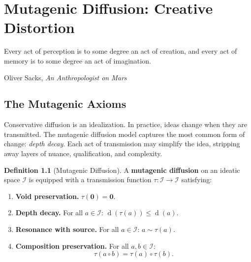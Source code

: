\documentclass[11pt,openany]{book}
\theoremstyle{definition}
\newtheorem{definition}[axiom]{Definition}
\theoremstyle{plain}
\theoremstyle{remark}
\newcommand{\IS}{\mathcal{I}}               %
\newcommand{\compose}{\circ}                 %
\newcommand{\void}{\mathbf{0}}              %
\newcommand{\res}{\sim}                      %
\newcommand{\depth}{\operatorname{d}}       %
\newcommand{\transmit}{\tau}                 %
\begin{document}
\chapter{Mutagenic Diffusion: Creative Distortion}
\label{ch:mutagenic}

\epigraph{Every act of perception is to some degree an act of creation, and every act of memory is to some degree an act of imagination.}{Oliver Sacks, \textit{An Anthropologist on Mars}}

\section{The Mutagenic Axioms}

Conservative diffusion is an idealization. In practice, ideas change when they are transmitted. The mutagenic diffusion model captures the most common form of change: \emph{depth decay}. Each act of transmission may simplify the idea, stripping away layers of nuance, qualification, and complexity.

\begin{definition}[Mutagenic Diffusion]
\label{def:mutagenic}
A \textbf{mutagenic diffusion} on an ideatic space $\IS$ is equipped with a transmission function $\transmit : \IS \to \IS$ satisfying:
\begin{enumerate}
\item[\textbf{(M1)}] \textbf{Void preservation.} $\transmit(\void) = \void$.
\item[\textbf{(M2)}] \textbf{Depth decay.} For all $a \in \IS$: $\depth(\transmit(a)) \leq \depth(a)$.
\item[\textbf{(M3)}] \textbf{Resonance with source.} For all $a \in \IS$: $a \res \transmit(a)$.
\item[\textbf{(M4)}] \textbf{Composition preservation.} For all $a, b \in \IS$:
\[ \transmit(a \compose b) = \transmit(a) \compose \transmit(b). \]
\end{enumerate}
\end{definition}
\end{document}

